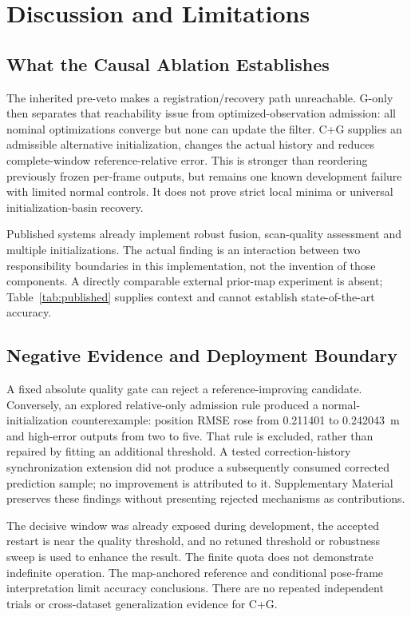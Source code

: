 \documentclass[journal,10pt,letterpaper]{IEEEtran}
\begin{document}
\section{Discussion and Limitations}
\subsection{What the Causal Ablation Establishes}
The inherited pre-veto makes a registration/recovery path unreachable. G-only then separates that reachability issue from optimized-observation admission: all nominal optimizations converge but none can update the filter. C+G supplies an admissible alternative initialization, changes the actual history and reduces complete-window reference-relative error. This is stronger than reordering previously frozen per-frame outputs, but remains one known development failure with limited normal controls. It does not prove strict local minima or universal initialization-basin recovery.

Published systems already implement robust fusion, scan-quality assessment and multiple initializations. The actual finding is an interaction between two responsibility boundaries in this implementation, not the invention of those components. A directly comparable external prior-map experiment is absent; Table~\ref{tab:published} supplies context and cannot establish state-of-the-art accuracy.

\subsection{Negative Evidence and Deployment Boundary}
A fixed absolute quality gate can reject a reference-improving candidate. Conversely, an explored relative-only admission rule produced a normal-initialization counterexample: position RMSE rose from 0.211401 to 0.242043~m and high-error outputs from two to five. That rule is excluded, rather than repaired by fitting an additional threshold. A tested correction-history synchronization extension did not produce a subsequently consumed corrected prediction sample; no improvement is attributed to it. Supplementary Material preserves these findings without presenting rejected mechanisms as contributions.

The decisive window was already exposed during development, the accepted restart is near the quality threshold, and no retuned threshold or robustness sweep is used to enhance the result. The finite quota does not demonstrate indefinite operation. The map-anchored reference and conditional pose-frame interpretation limit accuracy conclusions. There are no repeated independent trials or cross-dataset generalization evidence for C+G.
\end{document}
